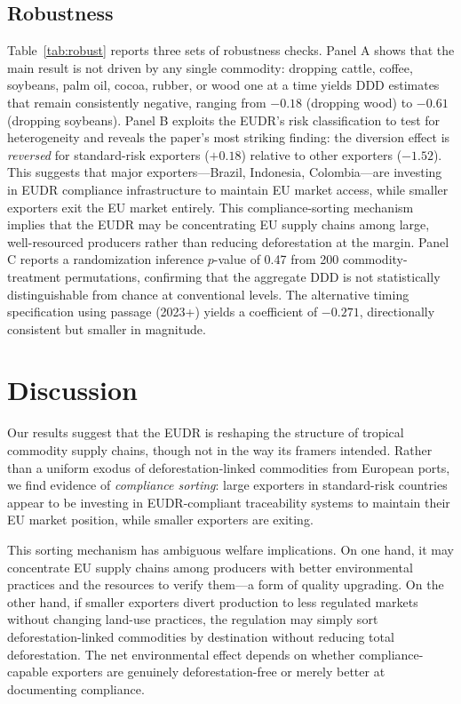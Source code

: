 \documentclass[12pt]{article}
\begin{document}
\subsection{Robustness}



Table~\ref{tab:robust} reports three sets of robustness checks. Panel A shows that the main result is not driven by any single commodity: dropping cattle, coffee, soybeans, palm oil, cocoa, rubber, or wood one at a time yields DDD estimates that remain consistently negative, ranging from $-0.18$ (dropping wood) to $-0.61$ (dropping soybeans). Panel B exploits the EUDR's risk classification to test for heterogeneity and reveals the paper's most striking finding: the diversion effect is \textit{reversed} for standard-risk exporters ($+0.18$) relative to other exporters ($-1.52$). This suggests that major exporters---Brazil, Indonesia, Colombia---are investing in EUDR compliance infrastructure to maintain EU market access, while smaller exporters exit the EU market entirely. This compliance-sorting mechanism implies that the EUDR may be concentrating EU supply chains among large, well-resourced producers rather than reducing deforestation at the margin. Panel C reports a randomization inference $p$-value of 0.47 from 200 commodity-treatment permutations, confirming that the aggregate DDD is not statistically distinguishable from chance at conventional levels. The alternative timing specification using passage (2023+) yields a coefficient of $-0.271$, directionally consistent but smaller in magnitude.


\section{Discussion}

Our results suggest that the EUDR is reshaping the structure of tropical commodity supply chains, though not in the way its framers intended. Rather than a uniform exodus of deforestation-linked commodities from European ports, we find evidence of \textit{compliance sorting}: large exporters in standard-risk countries appear to be investing in EUDR-compliant traceability systems to maintain their EU market position, while smaller exporters are exiting.

This sorting mechanism has ambiguous welfare implications. On one hand, it may concentrate EU supply chains among producers with better environmental practices and the resources to verify them---a form of quality upgrading. On the other hand, if smaller exporters divert production to less regulated markets without changing land-use practices, the regulation may simply sort deforestation-linked commodities by destination without reducing total deforestation. The net environmental effect depends on whether compliance-capable exporters are genuinely deforestation-free or merely better at documenting compliance.
\end{document}
